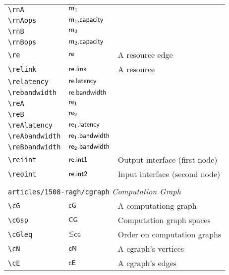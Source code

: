 \begin{longtable}{lll}
 {\color[rgb]{0.5,0.5,0.5}\texttt{\textbackslash rnA}} & $\mathsf{rn}_1$ & \\ 
 {\color[rgb]{0.5,0.5,0.5}\texttt{\textbackslash rnAops}} & $\mathsf{rn}_1.\mathsf{capacity}$ & \\ 
 {\color[rgb]{0.5,0.5,0.5}\texttt{\textbackslash rnB}} & $\mathsf{rn}_2$ & \\ 
 {\color[rgb]{0.5,0.5,0.5}\texttt{\textbackslash rnBops}} & $\mathsf{rn}_2.\mathsf{capacity}$ & \\ 
 {\color[rgb]{0.5,0.5,0.5}\texttt{\textbackslash re}} & $\mathsf{re}$ &  A resource edge\\ 
 {\color[rgb]{0.5,0.5,0.5}\texttt{\textbackslash relink}} & $\mathsf{re.link}$ &  A resource \\ 
 {\color[rgb]{0.5,0.5,0.5}\texttt{\textbackslash relatency}} & $\mathsf{re}\mathsf{.latency}$ & \\ 
 {\color[rgb]{0.5,0.5,0.5}\texttt{\textbackslash rebandwidth}} & $\mathsf{re}\mathsf{.bandwidth}$ & \\ 
 {\color[rgb]{0.5,0.5,0.5}\texttt{\textbackslash reA}} & $\mathsf{re}_1$ & \\ 
 {\color[rgb]{0.5,0.5,0.5}\texttt{\textbackslash reB}} & $\mathsf{re}_2$ & \\ 
 {\color[rgb]{0.5,0.5,0.5}\texttt{\textbackslash reAlatency}} & $\mathsf{re}_1\mathsf{.latency}$ & \\ 
 {\color[rgb]{0.5,0.5,0.5}\texttt{\textbackslash reAbandwidth}} & $\mathsf{re}_1\mathsf{.bandwidth}$ & \\ 
 {\color[rgb]{0.5,0.5,0.5}\texttt{\textbackslash reBbandwidth}} & $\mathsf{re}_2\mathsf{.bandwidth}$ & \\ 
 {\color[rgb]{0.5,0.5,0.5}\texttt{\textbackslash reiint}} & $\mathsf{re}\mathsf{.int1}$ &  Output interface (first node)\\ 
 {\color[rgb]{0.5,0.5,0.5}\texttt{\textbackslash reoint}} & $\mathsf{re}\mathsf{.int2}$ &  Input interface (second node)\\ 
  &  & \\ 
 \multicolumn{3}{l}{{\color[rgb]{0.5,0.5,0.5}\texttt{articles/1508-ragh/cgraph}} \emph{Computation Graph}}\\ 
 \hline
{\color[rgb]{0.5,0.5,0.5}\texttt{\textbackslash cG}} & $\mathsf{cG}$ &  A computationg graph\\ 
 {\color[rgb]{0.5,0.5,0.5}\texttt{\textbackslash cGsp}} & $\mathsf{CG}$ &  Computation graph spaces\\ 
 {\color[rgb]{0.5,0.5,0.5}\texttt{\textbackslash cGleq}} & $\leq_{\mathsf{CG}}$ &  Order on computation graphs\\ 
 {\color[rgb]{0.5,0.5,0.5}\texttt{\textbackslash cN}} & $\mathsf{cN}$ &  A cgraph's vertices\\ 
 {\color[rgb]{0.5,0.5,0.5}\texttt{\textbackslash cE}} & $\mathsf{cE}$ &  A cgraph's edges\\ 

\end{longtable}
